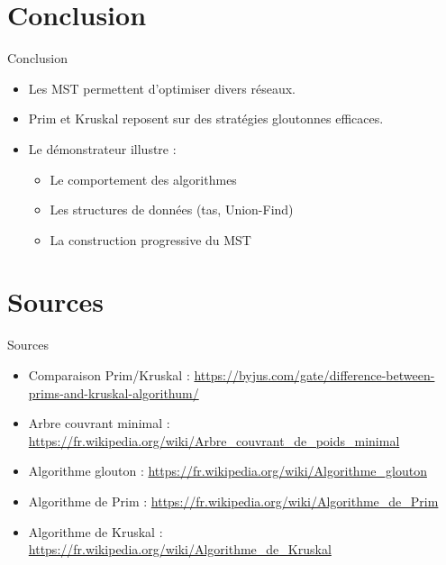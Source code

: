 \documentclass[10pt]{beamer}
\begin{document}
\section{Conclusion}

\begin{frame}{Conclusion}

\begin{itemize}
    \item Les MST permettent d’optimiser divers réseaux.
    \item Prim et Kruskal reposent sur des stratégies gloutonnes efficaces.
    \item Le démonstrateur illustre :
    \begin{itemize}
        \item Le comportement des algorithmes
        \item Les structures de données (tas, Union-Find)
        \item La construction progressive du MST
    \end{itemize}
\end{itemize}

\end{frame}

\section{Sources}

\begin{frame}{Sources}

\small
\begin{itemize}
    \item Comparaison Prim/Kruskal : \url{https://byjus.com/gate/difference-between-prims-and-kruskal-algorithum/}
    \item Arbre couvrant minimal : \url{https://fr.wikipedia.org/wiki/Arbre_couvrant_de_poids_minimal}
    \item Algorithme glouton : \url{https://fr.wikipedia.org/wiki/Algorithme_glouton}
    \item Algorithme de Prim : \url{https://fr.wikipedia.org/wiki/Algorithme_de_Prim}
    \item Algorithme de Kruskal : \url{https://fr.wikipedia.org/wiki/Algorithme_de_Kruskal}
\end{itemize}

\end{frame}
\end{document}
